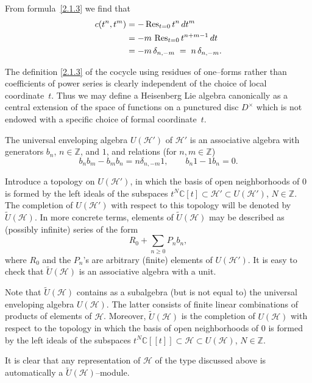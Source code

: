 \documentclass[12pt]{article}
\begin{document}
From formula~\eqref{2.1.3} we find that
\[
\begin{aligned}
c(t^n, t^m)
&= -\operatorname{Res}_{t=0} t^n\,dt^m \\
&= -m\,\operatorname{Res}_{t=0} t^{n+m-1}\,dt \\
&= -m\,\delta_{n,-m}
\;=\; n\,\delta_{n,-m}.
\end{aligned}
\]

The definition \eqref{2.1.3} of the cocycle using residues of one–forms rather than coefficients of power series is clearly independent of the choice of local coordinate~$t$.
Thus we may define a Heisenberg Lie algebra canonically as a central extension of the space of functions on a punctured disc $D^\times$ which is not endowed with a specific choice of formal coordinate~$t$.


The universal enveloping algebra $U(\mathcal{H}')$ of $\mathcal{H}'$ is an associative algebra with generators $b_n$, $n\in\mathbb{Z}$, and $1$, and relations (for $n,m\in\mathbb{Z}$)
\[
b_n b_m - b_m b_n = n \delta_{n,-m} 1, 
\qquad
b_n 1 - 1 b_n = 0.
\]

Introduce a topology on $U(\mathcal{H}')$, in which the basis of open neighborhoods of $0$ is formed by the left ideals of the subspaces 
$t^N\mathbb{C}[t] \subset \mathcal{H}' \subset U(\mathcal{H}')$, $N\in\mathbb{Z}$.
The completion of $U(\mathcal{H}')$ with respect to this topology will be denoted by $\widetilde{U}(\mathcal{H})$.
In more concrete terms, elements of $\widetilde{U}(\mathcal{H})$ may be described as (possibly infinite) series of the form
\[
R_0 + \sum_{n\ge 0} P_n b_n,
\]
where $R_0$ and the $P_n$’s are arbitrary (finite) elements of $U(\mathcal{H}')$.
It is easy to check that $\widetilde{U}(\mathcal{H})$ is an associative algebra with a unit.

Note that $\widetilde{U}(\mathcal{H})$ contains as a subalgebra (but is not equal to) the universal enveloping algebra $U(\mathcal{H})$.
The latter consists of finite linear combinations of products of elements of $\mathcal{H}$.
Moreover, $\widetilde{U}(\mathcal{H})$ is the completion of $U(\mathcal{H})$ with respect to the topology in which the basis of open neighborhoods of $0$ is formed by the left ideals of the subspaces 
$t^N\mathbb{C}[[t]] \subset \mathcal{H} \subset U(\mathcal{H})$, $N\in\mathbb{Z}$.

It is clear that any representation of $\mathcal{H}$ of the type discussed above is automatically a $\widetilde{U}(\mathcal{H})$–module.
\end{document}

